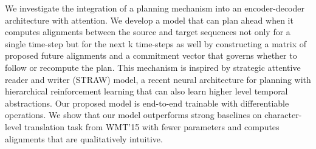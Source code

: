 We investigate the integration of a planning mechanism into an encoder-decoder architecture with attention. We develop a model that can plan ahead when it computes alignments between the source and target sequences not only for a single time-step but for the next k time-steps as well by constructing a matrix of proposed future alignments and a commitment vector that governs whether to follow or recompute the plan. This mechanism is inspired by strategic attentive reader and writer (STRAW) model, a recent neural architecture for planning with hierarchical reinforcement learning that can also learn higher level temporal abstractions. Our proposed model is end-to-end trainable with differentiable operations. We show that our model outperforms strong baselines on character-level translation task from WMT'15 with fewer parameters and computes alignments that are qualitatively intuitive.
